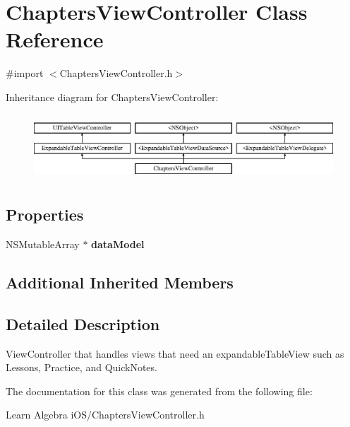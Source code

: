 \hypertarget{interface_chapters_view_controller}{\section{Chapters\-View\-Controller Class Reference}
\label{interface_chapters_view_controller}
}


{\ttfamily \#import $<$Chapters\-View\-Controller.\-h$>$}

Inheritance diagram for Chapters\-View\-Controller\-:\begin{figure}[H]
\begin{center}
\leavevmode
\includegraphics[height=2.477876cm]{interface_chapters_view_controller}
\end{center}
\end{figure}
\subsection*{Properties}
\begin{DoxyCompactItemize}
\item 
\hypertarget{interface_chapters_view_controller_a875cce3155f73a1aac44945d5e620710}{N\-S\-Mutable\-Array $\ast$ {\bfseries data\-Model}}\label{interface_chapters_view_controller_a875cce3155f73a1aac44945d5e620710}

\end{DoxyCompactItemize}
\subsection*{Additional Inherited Members}


\subsection{Detailed Description}
View\-Controller that handles views that need an expandable\-Table\-View such as Lessons, Practice, and Quick\-Notes. 

The documentation for this class was generated from the following file\-:\begin{DoxyCompactItemize}
\item 
Learn Algebra i\-O\-S/Chapters\-View\-Controller.\-h\end{DoxyCompactItemize}
